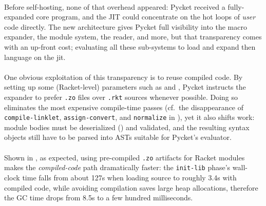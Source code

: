 		\paragraph{}%
			Before self-hosting, none of that overhead appeared: Pycket received a fully-expanded core program, and the JIT could concentrate on the hot loops of \emph{user} code directly. The new architecture gives Pycket full visibility into the macro expander, the module system, the reader, and more, but that transparency comes with an up-front cost; evaluating all these sub-systems to load and expand then language on the \gls{jit}.

		\paragraph{}%
			One obvious exploitation of this transparency is to reuse compiled code. By setting up some (Racket-level) parameters such as  and , Pycket instructs the expander to prefer \texttt{.zo} files over \texttt{.rkt} sources whenever possible. Doing so eliminates the most expensive compile-time passes (cf.\ the disappearance of \texttt{compile-linklet}, \texttt{assign-convert}, and \texttt{normalize} in ), yet it also shifts work: module bodies must be deserialized () and validated, and the resulting syntax objects still have to be parsed into ASTs suitable for Pycket's evaluator.

		\paragraph{}%
			Shown in , as expected, using pre-compiled \texttt{.zo} artifacts for Racket modules makes the \emph{compiled-code} path dramatically faster: the \texttt{init-lib} phase's wall-clock time falls from about 127s when loading source to roughly 3.4s with compiled code, while avoiding compilation saves large heap allocations, therefore the GC time drops from 8.5s to a few hundred milliseconds.

